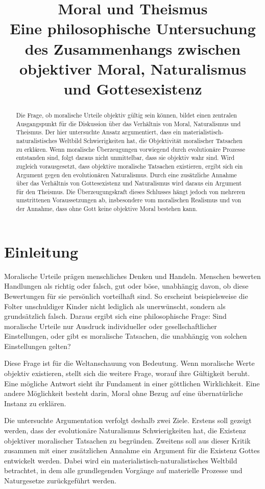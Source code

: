 \documentclass[a4paper,11pt]{article}
\title{\textbf{Moral und Theismus}\\
	\large Eine philosophische Untersuchung des Zusammenhangs
	zwischen objektiver Moral, Naturalismus und Gottesexistenz}
\author{}
\date{}
\begin{document}
	
	\maketitle
	
	\begin{abstract}
		Die Frage, ob moralische Urteile objektiv gültig sein können, bildet
		einen zentralen Ausgangspunkt für die Diskussion über das Verhältnis
		von Moral, Naturalismus und Theismus. Der hier untersuchte Ansatz
		argumentiert, dass ein materialistisch-naturalistisches Weltbild
		Schwierigkeiten hat, die Objektivität moralischer Tatsachen zu erklären.
		Wenn moralische Überzeugungen vorwiegend durch evolutionäre Prozesse
		entstanden sind, folgt daraus nicht unmittelbar, dass sie objektiv
		wahr sind. Wird zugleich vorausgesetzt, dass objektive moralische
		Tatsachen existieren, ergibt sich ein Argument gegen den evolutionären
		Naturalismus. Durch eine zusätzliche Annahme über das Verhältnis von
		Gottesexistenz und Naturalismus wird daraus ein Argument für den
		Theismus. Die Überzeugungskraft dieses Schlusses hängt jedoch von
		mehreren umstrittenen Voraussetzungen ab, insbesondere vom moralischen
		Realismus und von der Annahme, dass ohne Gott keine objektive Moral
		bestehen kann.
	\end{abstract}
	
	\section{Einleitung}
	
	Moralische Urteile prägen menschliches Denken und Handeln. Menschen
	bewerten Handlungen als richtig oder falsch, gut oder böse, unabhängig
	davon, ob diese Bewertungen für sie persönlich vorteilhaft sind.
	So erscheint beispielsweise die Folter unschuldiger Kinder nicht
	lediglich als unerwünscht, sondern als grundsätzlich falsch. Daraus
	ergibt sich eine philosophische Frage: Sind moralische Urteile nur
	Ausdruck individueller oder gesellschaftlicher Einstellungen, oder
	gibt es moralische Tatsachen, die unabhängig von solchen Einstellungen
	gelten?
	
	Diese Frage ist für die Weltanschauung von Bedeutung. Wenn moralische
	Werte objektiv existieren, stellt sich die weitere Frage, worauf ihre
	Gültigkeit beruht. Eine mögliche Antwort sieht ihr Fundament in einer
	göttlichen Wirklichkeit. Eine andere Möglichkeit besteht darin,
	Moral ohne Bezug auf eine übernatürliche Instanz zu erklären.
	
	Die untersuchte Argumentation verfolgt deshalb zwei Ziele. Erstens
	soll gezeigt werden, dass der evolutionäre Naturalismus Schwierigkeiten
	hat, die Existenz objektiver moralischer Tatsachen zu begründen.
	Zweitens soll aus dieser Kritik zusammen mit einer zusätzlichen
	Annahme ein Argument für die Existenz Gottes entwickelt werden.
	Dabei wird ein materialistisch-naturalistisches Weltbild betrachtet,
	in dem alle grundlegenden Vorgänge auf materielle Prozesse und
	Naturgesetze zurückgeführt werden.
	
\end{document}
